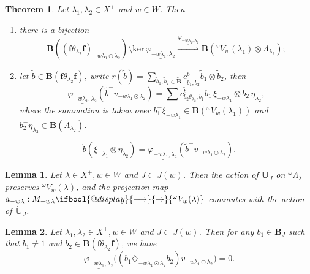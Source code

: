 \documentclass[10pt,a4paper]{amsart}
\makeatletter
\newtheorem{theorem}{Theorem}
\newtheorem{lemma}{Lemma}
\renewcommand{\to}{%
   \ifbool{@display}{\longrightarrow}{\rightarrow}%
   }
\makeatother
\begin{document}
\begin{theorem}\label{thm:structure-trans}
Let $\lambda_1,\lambda_2\in X^+$ and $w\in W$. Then
\begin{enumerate}
\item there is a bijection
$$\mathbf{B}((\mathbf{f}\theta_{\lambda_2}\mathbf{f})_{-w\lambda_1\odot\lambda_2})\setminus\mathrm{ker}\,\underline{\varphi_{-w\lambda_1,\lambda_2}}\xrightarrow{\underline{\varphi_{-w\lambda_1,\lambda_2}}}\mathbf{B}({^{\omega}V_w(\lambda_1)}\otimes \Lambda_{\lambda_2});$$
\item let $\tilde{b}\in \mathbf{B}(\mathbf{f}\theta_{\lambda_2}\mathbf{f})$, write $r(\tilde{b})=\sum_{\tilde{b}_1,\tilde{b}_2\in \tilde{\mathbf{B}}}c_{\tilde{b}_1,\tilde{b}_2}^{\tilde{b}}\tilde{b}_1\otimes\tilde{b}_2$, then 
$$\underline{\varphi_{-w\lambda_1,\lambda_2}}(\tilde{b}^-v_{-w\lambda_1\odot\lambda_2})=\sum c_{b_2\theta_{\lambda_2},b_1}^{\tilde{b}}b_1^-\xi_{-w\lambda_1}\otimes b_2^-\eta_{\lambda_2},$$
where the summation is taken over $b_1^-\xi_{-w\lambda_1}\in \mathbf{B}({^{\omega}V_w(\lambda_1)})$ and $b_2^-\eta_{\lambda_2}\in \mathbf{B}(\Lambda_{\lambda_2})$.
\end{enumerate}
\end{theorem}

\begin{equation}\label{definition of thickening map}
\dot{b}(\xi_{-\lambda_1}\otimes \eta_{\lambda_2})=\underline{\varphi_{-w\lambda_1,\lambda_2}}(\tilde{b}^-v_{-w\lambda_1\odot\lambda_2}).   
\end{equation}

\begin{lemma}\label{lem:Demazure-UJ}
Let $\lambda \in X^+,w \in W$ and $J\subset J(w)$. Then the action of $\dot{\mathbf{U}}_J$ on $^{\omega}\Lambda_{\lambda}$ preserves ${^{\omega}V_{w}(\lambda)}$, and the projection map $a_{-w\lambda}: M_{-w\lambda} \to {^{\omega}V_{w}(\lambda)}$ commutes with the action of $\dot{\mathbf{U}}_J$.
\end{lemma}

\begin{lemma}\label{canonical basis of U dot acts on Verma}
Let $\lambda_1,\lambda_2\in X^+,w\in W$ and $J\subset J(w)$. Then for any $b_1\in \mathbf{B}_J$ such that $b_1 \neq 1$ and $b_2\in \mathbf{B}(\mathbf{f}\theta_{\lambda_2}\mathbf{f})$, we have 
$$\underline{\varphi_{-w\lambda_1,\lambda_2}}\bigl((b_1\diamondsuit_{-w\lambda_1\odot\lambda_2}b_2)v_{-w\lambda_1\odot\lambda_2}\bigr)=0.$$
\end{lemma}
\end{document}
